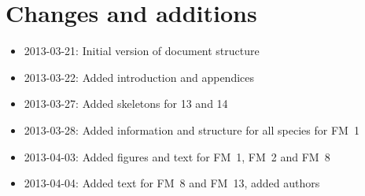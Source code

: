 \chapter{Changes and additions}
\label{ch:changes}

\begin{itemize}
    \item 2013-03-21: Initial version of document structure
    \item 2013-03-22: Added introduction and appendices
    \item 2013-03-27: Added skeletons for 13 and 14
    \item 2013-03-28: Added information and structure for all species for FM~1
    \item 2013-04-03: Added figures and text for FM~1, FM~2 and FM~8
    \item 2013-04-04: Added text for FM~8 and FM~13, added authors
\end{itemize}

